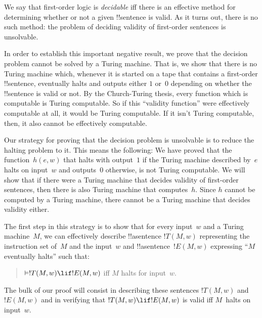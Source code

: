 \documentclass[../../../include/open-logic-section]{subfiles}
\begin{document}

We say that first-order logic is \emph{decidable} iff there is an
effective method for determining whether or not a given !!{sentence}
is valid. As it turns out, there is no such method: the problem of
deciding validity of first-order sentences is unsolvable.

In order to establish this important negative result, we prove that
the decision problem cannot be solved by a Turing machine.  That is,
we show that there is no Turing machine which, whenever it is started
on a tape that contains a first-order !!{sentence}, eventually halts
and outputs either $1$ or~$0$ depending on whether the
!!{sentence} is valid or not. By the Church-Turing thesis, every
function which is computable is Turing computable. So if this
``validity function'' were effectively computable at all, it would be
Turing computable. If it isn't Turing computable, then, it also cannot
be effectively computable.

Our strategy for proving that the decision problem is unsolvable is to
reduce the halting problem to it.  This means the following: We have
proved that the function~$h(e,w)$ that halts with output~$1$ if the
Turing machine described by~$e$ halts on input~$w$ and outputs~$0$
otherwise, is not Turing computable.  We will show that if there were
a Turing machine that decides validity of first-order sentences, then
there is also Turing machine that computes~$h$.  Since $h$ cannot be
computed by a Turing machine, there cannot be a Turing machine that
decides validity either.

The first step in this strategy is to show that for every input~$w$
and a Turing machine~$M$, we can effectively describe !!a{sentence}
$!T(M, w)$ representing the instruction set of~$M$ and the input~$w$
and !!a{sentence}~$!E(M, w)$ expressing ``$M$ eventually halts'' such
that:
\begin{quote}
  $\Entails !T(M, w) \lif !E(M,w)$ iff $M$ halts for input~$w$.
\end{quote}
The bulk of our proof will consist in describing these sentences
$!T(M, w)$ and~$!E(M, w)$ and in verifying that $!T(M, w) \lif !E(M, w)$
is valid iff $M$~halts on input~$w$.
\end{document}
